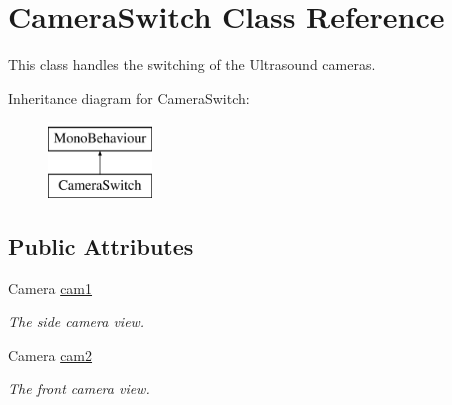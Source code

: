 \hypertarget{class_camera_switch}{}\section{Camera\+Switch Class Reference}
\label{class_camera_switch}


This class handles the switching of the Ultrasound cameras.  


Inheritance diagram for Camera\+Switch\+:\begin{figure}[H]
\begin{center}
\leavevmode
\includegraphics[height=2.000000cm]{class_camera_switch}
\end{center}
\end{figure}
\subsection*{Public Attributes}
\begin{DoxyCompactItemize}
\item 
\mbox{\label{class_camera_switch_a99b51c5d37b6408d27babcaefd32b51e}} 
Camera \mbox{\hyperlink{class_camera_switch_a99b51c5d37b6408d27babcaefd32b51e}{cam1}}
\begin{DoxyCompactList}\small\item\em The side camera view. \end{DoxyCompactList}\item 
\mbox{\label{class_camera_switch_abbd581bda001de43a9bddee1b3456a5c}} 
Camera \mbox{\hyperlink{class_camera_switch_abbd581bda001de43a9bddee1b3456a5c}{cam2}}
\begin{DoxyCompactList}\small\item\em The front camera view. \end{DoxyCompactList}\end{DoxyCompactItemize}
